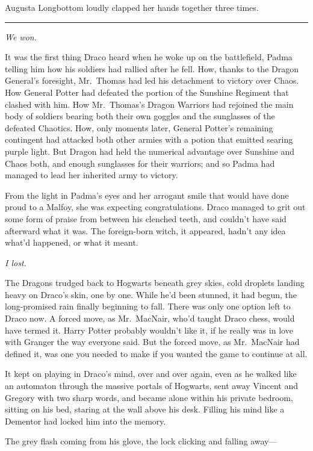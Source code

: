 Augusta Longbottom loudly clapped her hands together three times.

\begin{center}\rule{3in}{0.4pt}\end{center}

\emph{We won.}

It was the first thing Draco heard when he woke up on the battlefield,
Padma telling him how his soldiers had rallied after he fell. How,
thanks to the Dragon General's foresight, Mr.~Thomas had led his
detachment to victory over Chaos. How General Potter had defeated the
portion of the Sunshine Regiment that clashed with him. How Mr.~Thomas's
Dragon Warriors had rejoined the main body of soldiers bearing both
their own goggles and the sunglasses of the defeated Chaotics. How, only
moments later, General Potter's remaining contingent had attacked both
other armies with a potion that emitted searing purple light. But Dragon
had held the numerical advantage over Sunshine and Chaos both, and
enough sunglasses for their warriors; and so Padma had managed to lead
her inherited army to victory.

From the light in Padma's eyes and her arrogant smile that would have
done proud to a Malfoy, she was expecting congratulations. Draco managed
to grit out some form of praise from between his clenched teeth, and
couldn't have said afterward what it was. The foreign-born witch, it
appeared, hadn't any idea what'd happened, or what it meant.

\emph{I lost.}

The Dragons trudged back to Hogwarts beneath grey skies, cold droplets
landing heavy on Draco's skin, one by one. While he'd been stunned, it
had begun, the long-promised rain finally beginning to fall. There was
only one option left to Draco now. A forced move, as Mr.~MacNair, who'd
taught Draco chess, would have termed it. Harry Potter probably wouldn't
like it, if he really was in love with Granger the way everyone said.
But the forced move, as Mr.~MacNair had defined it, was one you needed
to make if you wanted the game to continue at all.

It kept on playing in Draco's mind, over and over again, even as he
walked like an automaton through the massive portals of Hogwarts, sent
away Vincent and Gregory with two sharp words, and became alone within
his private bedroom, sitting on his bed, staring at the wall above his
desk. Filling his mind like a Dementor had locked him into the memory.

The grey flash coming from his glove, the lock clicking and falling
away---

